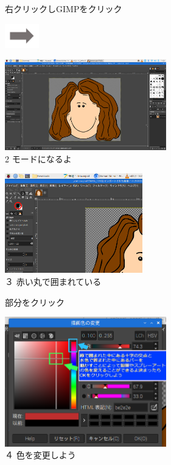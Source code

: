 \documentclass[a4paper,12pt]{jarticle}
\begin{document}
\begin{figure}[ht]
\begin{minipage}{\textwidth}
\begin{minipage}{5.852cm}
      右クリックしGIMPをクリック
    \end{minipage}
    \includegraphics[width=1.489cm]{textbook-img128.png}
    \begin{minipage}{7.975cm}
      \includegraphics[width=7cm]{textbook-img125.png}\\
      2 モードになるよ
    \end{minipage}


  \end{minipage}
  \bigskip




  \begin{minipage}{\textwidth}
    \begin{minipage}{5.984cm}
      \includegraphics[width=5.971cm]{textbook-img129.png}\\
      ３ 赤い丸で囲まれている

      部分をクリック


      \bigskip
    \end{minipage}
    \hfill
    \begin{minipage}{8.984cm}
      \includegraphics[width=7cm]{textbook-img126.png}\\
      ４ 色を変更しよう


\end{minipage}
\end{minipage}
\end{figure}
\end{document}

